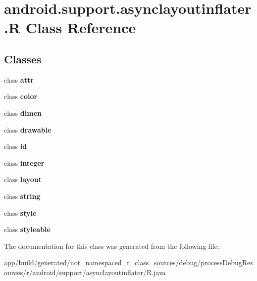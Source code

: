 \hypertarget{classandroid_1_1support_1_1asynclayoutinflater_1_1_r}{}\section{android.\+support.\+asynclayoutinflater.\+R Class Reference}
\label{classandroid_1_1support_1_1asynclayoutinflater_1_1_r}
\subsection*{Classes}
\begin{DoxyCompactItemize}
\item 
class {\bfseries attr}
\item 
class {\bfseries color}
\item 
class {\bfseries dimen}
\item 
class {\bfseries drawable}
\item 
class {\bfseries id}
\item 
class {\bfseries integer}
\item 
class {\bfseries layout}
\item 
class {\bfseries string}
\item 
class {\bfseries style}
\item 
class {\bfseries styleable}
\end{DoxyCompactItemize}


The documentation for this class was generated from the following file\+:\begin{DoxyCompactItemize}
\item 
app/build/generated/not\+\_\+namespaced\+\_\+r\+\_\+class\+\_\+sources/debug/process\+Debug\+Resources/r/android/support/asynclayoutinflater/R.\+java\end{DoxyCompactItemize}
